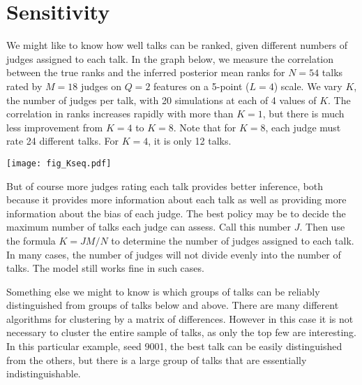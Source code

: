 \documentclass[reqno ,11pt]{amsart}
\begin{document}
\section{Sensitivity}

We might like to know how well talks can be ranked, given different numbers of judges assigned to each talk. In the graph below, we measure the correlation between the true ranks and the inferred posterior mean ranks for $N=54$ talks rated by $M=18$ judges on $Q=2$ features on a 5-point ($L=4$) scale. We vary $K$, the number of judges per talk, with 20 simulations at each of 4 values of $K$. The correlation in ranks increases rapidly with more than $K=1$, but there is much less improvement from $K=4$ to $K=8$. Note that for $K=8$, each judge must rate 24 different talks. For $K=4$, it is only 12 talks. 
\vspace{-1em}
\begin{center}
  \texttt{[image: fig\_Kseq.pdf]}
\end{center}
But of course more judges rating each talk provides better inference, both because it provides more information about each talk as well as providing more information about the bias of each judge. The best policy may be to decide the maximum number of talks each judge can assess. Call this number $J$. Then use the formula $K = JM/N$ to determine the number of judges assigned to each talk. In many cases, the number of judges will not divide evenly into the number of talks. The model still works fine in such cases.

Something else we might to know is which groups of talks can be reliably distinguished from groups of talks below and above. There are many different algorithms for clustering by a matrix of differences. However in this case it is not necessary to cluster the entire sample of talks, as only the top few are interesting. In this particular example, seed 9001, the best talk can be easily distinguished from the others, but there is a large group of talks that are essentially indistinguishable.

\clearpage
 

\end{document}
